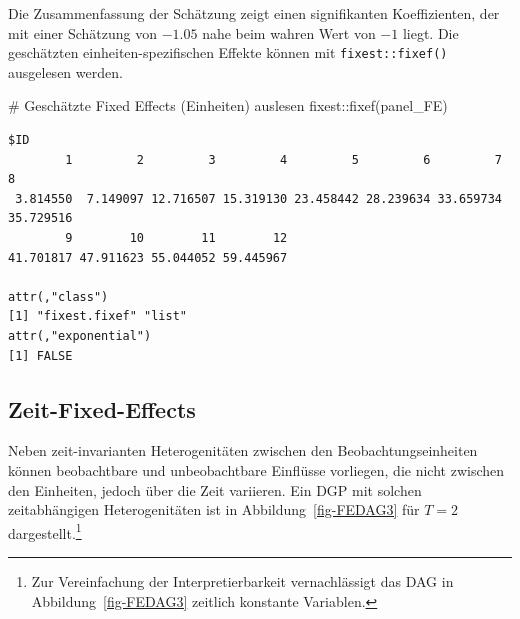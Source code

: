 \documentclass[
  a4paper,
  DIV=11,
  oneside]{scrreprt}
\newenvironment{Shaded}{\begin{snugshade}}{\end{snugshade}}
\newcommand{\CommentTok}[1]{\textcolor[rgb]{0.37,0.37,0.37}{#1}}
\newcommand{\FunctionTok}[1]{\textcolor[rgb]{0.28,0.35,0.67}{#1}}
\newcommand{\NormalTok}[1]{\textcolor[rgb]{0.00,0.23,0.31}{#1}}
\newcommand{\SpecialCharTok}[1]{\textcolor[rgb]{0.37,0.37,0.37}{#1}}
\begin{document}
Die Zusammenfassung der Schätzung zeigt einen signifikanten
Koeffizienten, der mit einer Schätzung von \(-1.05\) nahe beim wahren
Wert von \(-1\) liegt. Die geschätzten einheiten-spezifischen Effekte
können mit \texttt{fixest::fixef()} ausgelesen werden.

\begin{Shaded}
\begin{Highlighting}[]
\CommentTok{\# Geschätzte Fixed Effects (Einheiten) auslesen}
\NormalTok{fixest}\SpecialCharTok{::}\FunctionTok{fixef}\NormalTok{(panel\_FE)}
\end{Highlighting}
\end{Shaded}

\begin{verbatim}
$ID
        1         2         3         4         5         6         7         8 
 3.814550  7.149097 12.716507 15.319130 23.458442 28.239634 33.659734 35.729516 
        9        10        11        12 
41.701817 47.911623 55.044052 59.445967 

attr(,"class")
[1] "fixest.fixef" "list"        
attr(,"exponential")
[1] FALSE
\end{verbatim}

\subsection{Zeit-Fixed-Effects}\label{zeit-fixed-effects}

Neben zeit-invarianten Heterogenitäten zwischen den
Beobachtungseinheiten können beobachtbare und unbeobachtbare Einflüsse
vorliegen, die nicht zwischen den Einheiten, jedoch über die Zeit
variieren. Ein DGP mit solchen zeitabhängigen Heterogenitäten ist in
Abbildung~\ref{fig-FEDAG3} für \(T=2\) dargestellt.\footnote{Zur
  Vereinfachung der Interpretierbarkeit vernachlässigt das DAG in
  Abbildung~\ref{fig-FEDAG3} zeitlich konstante Variablen.}
\end{document}
